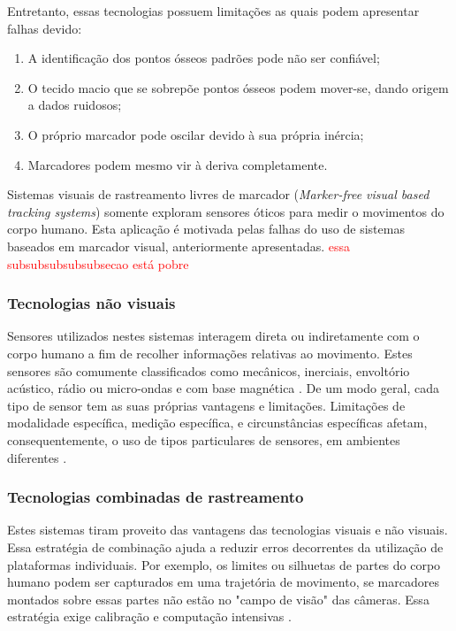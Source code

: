 Entretanto, essas tecnologias possuem limitações as quais podem apresentar falhas devido:

\begin{enumerate}
    \item A identificação dos pontos ósseos padrões pode não ser confiável; 
    \item O tecido macio que se sobrepõe pontos ósseos podem mover-se, dando origem a dados ruidosos; 
    \item O próprio marcador pode oscilar devido à sua própria inércia; 
    \item Marcadores podem mesmo vir à deriva completamente.
\end{enumerate}

Sistemas visuais de rastreamento livres de marcador (\textit{Marker-free visual based tracking systems}) somente exploram sensores óticos para medir o movimentos do corpo humano. Esta aplicação é motivada pelas falhas do uso de sistemas baseados em marcador visual, anteriormente apresentadas. 
 \textcolor{red}{essa subsubsubsubsubsecao está pobre}



\subsubsection{Tecnologias não visuais}\label{sec:tec-vis}
Sensores utilizados nestes sistemas interagem direta ou indiretamente com o corpo humano a fim de recolher informações relativas ao movimento. Estes sensores são comumente classificados como mecânicos, inerciais, envoltório acústico, rádio ou micro-ondas e com base magnética \cite{zhou2008human}. De um modo geral, cada tipo de sensor tem as suas próprias vantagens e limitações. Limitações de modalidade específica, medição específica, e circunstâncias específicas afetam, consequentemente, o uso de tipos particulares de sensores, em ambientes diferentes \cite{Welch:2002}.

\subsubsection{Tecnologias combinadas de rastreamento}\label{sec:rastre-robo}
Estes sistemas tiram proveito das vantagens das tecnologias visuais e não visuais. Essa estratégia de combinação ajuda a reduzir erros decorrentes da utilização de plataformas individuais. Por exemplo, os limites ou silhuetas de partes do corpo humano podem ser capturados em uma trajetória de movimento, se marcadores montados sobre essas partes não estão no "campo de visão" das câmeras. Essa estratégia exige calibração e computação intensivas \cite{zhou2008human}.


